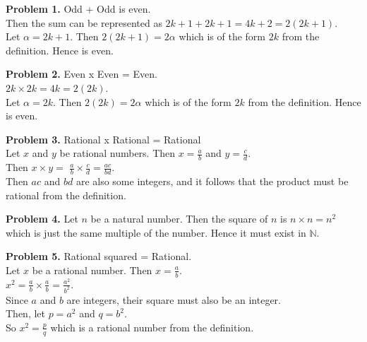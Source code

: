 \documentclass[addpoints]{exam}
\begin{document}
\begin{questions}
    \question
    \begin{solution}
        
        \textbf{Problem 1.} Odd + Odd is even. \\ 
        Then the sum can be represented as $ 2k + 1 + 2k + 1 = 4k + 2 = 2(2k + 1)$. \\ 
        Let $ \alpha = 2k + 1 $. Then $ 2(2k + 1) = 2\alpha $ which is of the form $ 2k $ from the definition. Hence is even. \vspace{2mm}

        \textbf{Problem 2.} Even x Even = Even. \\ 
        $ 2k \times 2k = 4k = 2(2k) $. \\ Let $ \alpha = 2k $. Then $ 2(2k) = 2\alpha $ which is of the form $ 2k $ from the definition. Hence is even. \vspace{2mm}

        \textbf{Problem 3.} Rational x Rational = Rational \\ Let $ x $ and $ y $ be rational numbers. Then $x = \frac{a}{b}$ and $ y = \frac{c}{d} $. \\ Then $x \times y = $
        $ \frac{a}{b} \times \frac{c}{d} = \frac{ac}{bd} $. \\ Then $ac$ and $bd$ are also some integers, and it follows that the product must be rational from the definition. \vspace{2mm}

        \textbf{Problem 4.} Let $n$ be a natural number. Then the square of $n$ is $n \times n = n^2$ which is just the same multiple of the number. Hence it must exist in $ \mathbb{N}$. \vspace{2mm}
        
        \textbf{Problem 5.} Rational squared = Rational. \\ 
        Let $x$ be a rational number. Then $ x = \frac{a}{b} $. \\ 
        $ x^2 = \frac{a}{b} \times \frac{a}{b} = \frac{a^2}{b^2}$. \\ 
        Since $a$ and $b$ are integers, their square must also be an integer.\\ Then, let $ p = a^2 $ and $ q = b^2 $. \\ So $ x^2 = \frac{p}{q} $ which is a rational number from the definition. \vspace{2mm}


\end{solution}
\end{questions}
\end{document}
